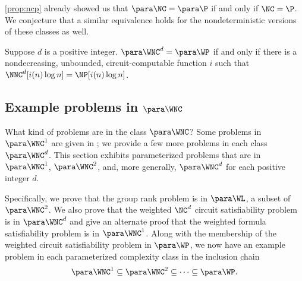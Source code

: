 \autoref{prop:ncp} already showed us that $\para \NC = \para \P$ if and only if $\NC = \P$.
We conjecture that a similar equivalence holds for the nondeterministic versions of these classes as well.

\begin{conjecture}\label{con:wncwp}
  Suppose $d$ is a positive integer.
  $\para \WNC^d = \para \WP$ if and only if there is a nondecreasing, unbounded, circuit-computable function $i$ such that $\NNC^d[i(n) \log n] = \NP[i(n) \log n]$.
\end{conjecture}

\subsection{Example problems in \texorpdfstring{$\para \WNC$}{paraWNC}}
\label{sec:rankinwp}

%
%
%
What kind of problems are in the class $\para \WNC$?
%
%
%
Some problems in $\para \WNC^1$ are given in \autocite{est15};
%
%
%
we provide a few more problems in each class $\para \WNC^d$.
%
%
%
This section exhibits parameterized problems that are in $\para \WNC^1$, $\para \WNC^2$, and, more generally, $\para \WNC^d$ for each positive integer $d$.

%
%
%
Specifically, we prove that the group rank problem is in $\para \WL$, a subset of $\para \WNC^2$.
We also prove that the weighted $\NC^d$ circuit satisfiability problem is in $\para \WNC^d$ and give an alternate proof that the weighted formula satisfiability problem is in $\para \WNC^1$.
%
%
%
Along with the membership of the weighted circuit satisfiability problem in $\para \WP$, we now have an example problem in each parameterized complexity class in the inclusion chain
$$
\para \WNC^1 \subseteq \para \WNC^2 \subseteq \dotsb \subseteq \para \WP.
$$
%
%

